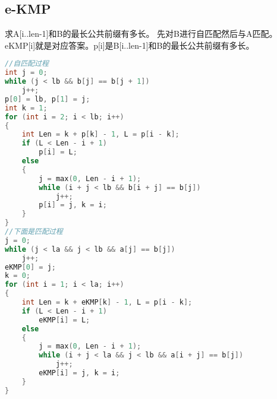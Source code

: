 \subsection{e-KMP}
	求A[i..len-1]和B的最长公共前缀有多长。
	先对B进行自匹配然后与A匹配。
	eKMP[i]就是对应答案。p[i]是B[i..len-1]和B的最长公共前缀有多长。
	\begin{lstlisting}[language=c++]
//自匹配过程
int j = 0;
while (j < lb && b[j] == b[j + 1])
	j++;
p[0] = lb, p[1] = j;
int k = 1;
for (int i = 2; i < lb; i++)
{
	int Len = k + p[k] - 1, L = p[i - k];
	if (L < Len - i + 1)
		p[i] = L;
	else
	{
		j = max(0, Len - i + 1);
		while (i + j < lb && b[i + j] == b[j])
			j++;
		p[i] = j, k = i;
	}
}
//下面是匹配过程
j = 0;
while (j < la && j < lb && a[j] == b[j])
	j++;
eKMP[0] = j;
k = 0;
for (int i = 1; i < la; i++)
{
	int Len = k + eKMP[k] - 1, L = p[i - k];
	if (L < Len - i + 1)
		eKMP[i] = L;
	else
	{
		j = max(0, Len - i + 1);
		while (i + j < la && j < lb && a[i + j] == b[j])
			j++;
		eKMP[i] = j, k = i;
	}
}
	\end{lstlisting} 